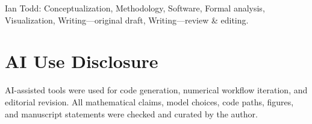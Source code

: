 \documentclass[11pt,a4paper]{article}
\theoremstyle{definition}
\theoremstyle{remark}
\begin{document}
Ian Todd: Conceptualization, Methodology, Software, Formal analysis, Visualization, Writing---original draft, Writing---review \& editing.

\section*{AI Use Disclosure}

AI-assisted tools were used for code generation, numerical workflow iteration, and editorial revision. All mathematical claims, model choices, code paths, figures, and manuscript statements were checked and curated by the author.



\end{document}
